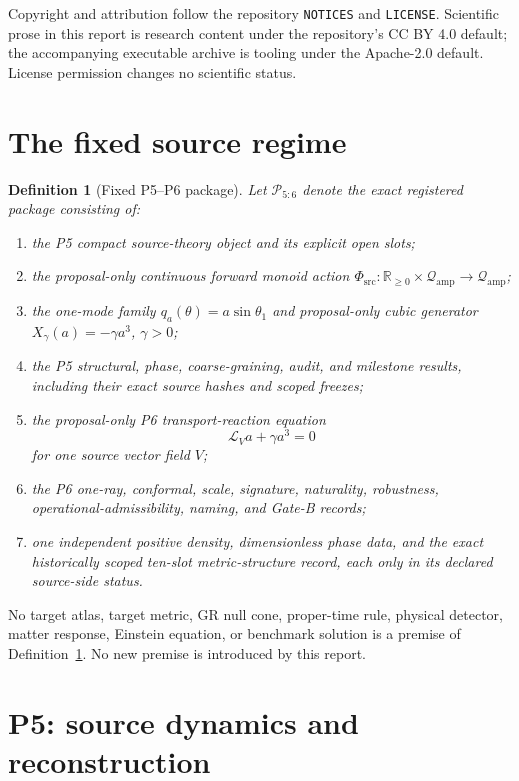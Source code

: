 \documentclass[11pt]{article}
\newtheorem{definition}{Definition}
\newcommand{\Qamp}{\mathcal Q_{\mathrm{amp}}}
\newcommand{\Phisrc}{\Phi_{\mathrm{src}}}
\begin{document}
Copyright and attribution follow the repository \texttt{NOTICES} and
\texttt{LICENSE}.  Scientific prose in this report is research content under
the repository's CC BY 4.0 default; the accompanying executable archive is
tooling under the Apache-2.0 default.  License permission changes no
scientific status.

\section{The fixed source regime}

\begin{definition}[Fixed P5--P6 package]
\label{def:package}
Let \(\mathcal P_{5:6}\) denote the exact registered package consisting of:
\begin{enumerate}
  \item the P5 compact source-theory object and its explicit open slots;
  \item the proposal-only continuous forward monoid action
  \(\Phisrc:\mathbb R_{\geq0}\times\Qamp\to\Qamp\);
  \item the one-mode family
  \(q_a(\theta)=a\sin\theta_1\) and proposal-only cubic generator
  \(X_\gamma(a)=-\gamma a^3\), \(\gamma>0\);
  \item the P5 structural, phase, coarse-graining, audit, and milestone
  results, including their exact source hashes and scoped freezes;
  \item the proposal-only P6 transport-reaction equation
  \[
     \mathcal L_Va+\gamma a^3=0
  \]
  for one source vector field \(V\);
  \item the P6 one-ray, conformal, scale, signature, naturality, robustness,
  operational-admissibility, naming, and Gate-B records;
  \item one independent positive density, dimensionless phase data, and the
  exact historically scoped ten-slot metric-structure record, each only in
  its declared source-side status.
\end{enumerate}
\end{definition}

No target atlas, target metric, GR null cone, proper-time rule, physical
detector, matter response, Einstein equation, or benchmark solution is a
premise of Definition~\ref{def:package}.  No new premise is introduced by
this report.

\section{P5: source dynamics and reconstruction}
\end{document}

